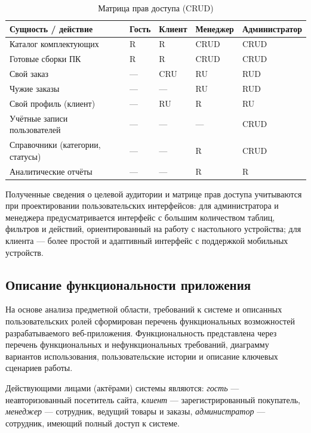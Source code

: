 \documentclass[14pt, a4paper]{extarticle}
\begin{document}
\begin{table}[ht!]
\caption{Матрица прав доступа (CRUD)}
\label{tab:rbac}
\small
\begin{tabularx}{\textwidth}{|>{\RaggedRight\arraybackslash}p{}|>{\centering\arraybackslash}X|>{\centering\arraybackslash}X|>{\centering\arraybackslash}X|>{\centering\arraybackslash}X|}
\hline
\textbf{Сущность / действие} & \textbf{Гость} & \textbf{Клиент} & \textbf{Мене\-джер} & \textbf{Адми\-нистра\-тор} \\ \hline
Каталог комплектующих & R & R & CRUD & CRUD \\ \hline
Готовые сборки ПК & R & R & CRUD & CRUD \\ \hline
Свой заказ & --- & CRU & RU & RUD \\ \hline
Чужие заказы & --- & --- & RU & RUD \\ \hline
Свой профиль (клиент) & --- & RU & R & RU \\ \hline
Учётные записи пользователей & --- & --- & --- & CRUD \\ \hline
Справочники (категории, статусы) & --- & --- & R & CRUD \\ \hline
Аналитические отчёты & --- & --- & R & R \\ \hline
\end{tabularx}
\end{table}

Полученные сведения о целевой аудитории и матрице прав доступа учитываются при проектировании пользовательских интерфейсов: для администратора и менеджера предусматривается интерфейс с большим количеством таблиц, фильтров и действий, ориентированный на работу с настольного устройства; для клиента --- более простой и адаптивный интерфейс с поддержкой мобильных устройств.

\subsection{Описание функциональности приложения}

На основе анализа предметной области, требований к системе и описанных пользовательских ролей сформирован перечень функциональных возможностей разрабатываемого веб-приложения. Функциональность представлена через перечень функциональных и нефункциональных требований, диаграмму вариантов использования, пользовательские истории и описание ключевых сценариев работы.

Действующими лицами (актёрами) системы являются: \emph{гость} --- неавторизованный посетитель сайта, \emph{клиент} --- зарегистрированный покупатель, \emph{менеджер} --- сотрудник, ведущий товары и заказы, \emph{администратор} --- сотрудник, имеющий полный доступ к системе.
\end{document}
